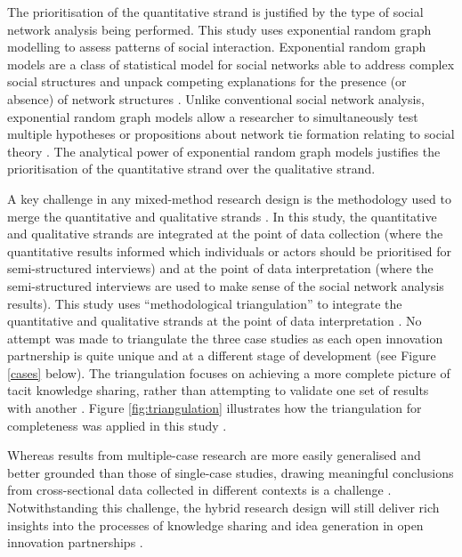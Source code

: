 The prioritisation of the quantitative strand is justified by the type of social network analysis being performed. This study uses exponential random graph modelling to assess patterns of social interaction. Exponential random graph models are a class of statistical model for social networks able to address complex social structures and unpack competing explanations for the presence (or absence) of network structures \citep{lusher2013exponential}. Unlike conventional social network analysis, exponential random graph models allow a researcher to simultaneously test multiple hypotheses or propositions about network tie formation relating to social theory \citep{robins2007recent}. The analytical power of exponential random graph models justifies the prioritisation of the quantitative strand over the qualitative strand. \medskip

A key challenge in any mixed\hyp{}method research design is the methodology used to merge the quantitative and qualitative strands \citep{ostlund2011combining}. In this study, the quantitative and qualitative strands are integrated at the point of data collection (where the quantitative results informed which individuals or actors should be prioritised for semi-structured interviews) and at the point of data interpretation (where the semi-structured interviews are used to make sense of the social network analysis results). This study uses \enquote{methodological triangulation} to integrate the quantitative and qualitative strands at the point of data interpretation \citep{denzin1994handbook}. No attempt was made to triangulate the three case studies as each open innovation partnership is quite unique and at a different stage of development (see Figure \ref{cases} below). The triangulation focuses on achieving a more complete picture of tacit knowledge sharing, rather than attempting to validate one set of results with another \citep{adami2005use}. Figure \ref{fig:triangulation} illustrates how the triangulation for completeness was applied in this study \citep{ostlund2011combining}. \medskip


Whereas results from multiple\hyp{}case research are more easily generalised and better grounded than those of single\hyp{}case studies, drawing meaningful conclusions from cross\hyp{}sectional data collected in different contexts is a challenge \citep{eisenhardt2007theory}. Notwithstanding this challenge, the hybrid research design will still deliver rich insights into the processes of knowledge sharing and idea generation in open innovation partnerships \citep{walsham1995interpretive}. \medskip

